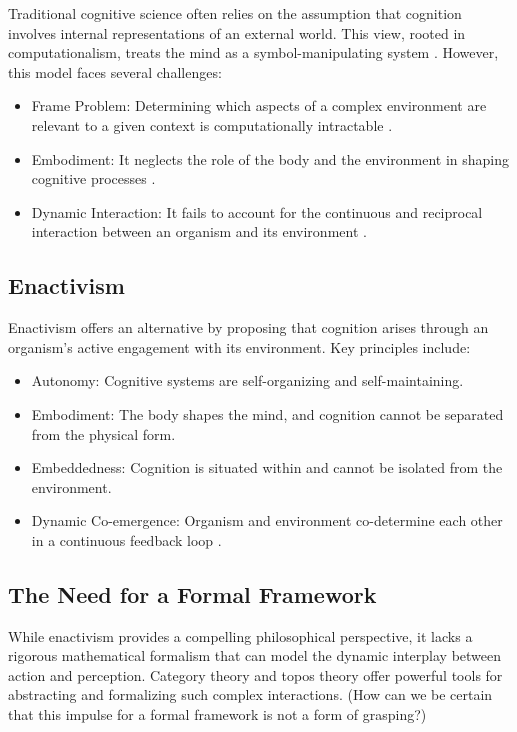 \documentclass{article}
\begin{document}
Traditional cognitive science often relies on the assumption that cognition involves internal representations of an external world. This view, rooted in computationalism, treats the mind as a symbol-manipulating system \cite{fodor1980}. However, this model faces several challenges:

\begin{itemize}
    \item Frame Problem: Determining which aspects of a complex environment are relevant to a given context is computationally intractable \cite{pylyshyn1987}.
    \item Embodiment: It neglects the role of the body and the environment in shaping cognitive processes \cite{clark1997}.
    \item Dynamic Interaction: It fails to account for the continuous and reciprocal interaction between an organism and its environment \cite{thompson2007}.
\end{itemize}

\subsection{Enactivism}

Enactivism offers an alternative by proposing that cognition arises through an organism's active engagement with its environment. Key principles include:

\begin{itemize} \item Autonomy: Cognitive systems are self-organizing and self-maintaining. \item Embodiment: The body shapes the mind, and cognition cannot be separated from the physical form. \item Embeddedness: Cognition is situated within and cannot be isolated from the environment. \item Dynamic Co-emergence: Organism and environment co-determine each other in a continuous feedback loop \cite{varela1991}. \end{itemize}

\subsection{The Need for a Formal Framework}

While enactivism provides a compelling philosophical perspective, it lacks a rigorous mathematical formalism that can model the dynamic interplay between action and perception. Category theory and topos theory offer powerful tools for abstracting and formalizing such complex interactions. (How can we be certain that this impulse for a formal framework is not a form of grasping?)
\end{document}
